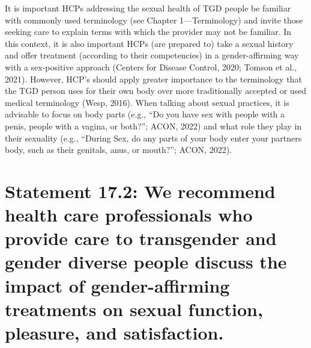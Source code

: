 \documentclass[
]{book}
\begin{document}
It is important HCPs addressing the sexual
health of TGD people be familiar with commonly
used terminology (see Chapter 1---Terminology)
and invite those seeking care to explain terms
with which the provider may not be familiar. In
this context, it is also important HCPs (are
prepared to) take a sexual history and offer treatment (according to their competencies) in a
gender-affirming way with a sex-positive approach
(Centers for Disease Control, 2020; Tomson et al.,
2021). However, HCP's should apply greater
importance to the terminology that the TGD
person uses for their own body over more traditionally accepted or used medical terminology
(Wesp, 2016). When talking about sexual practices, it is advisable to focus on body parts (e.g.,
``Do you have sex with people with a penis, people with a vagina, or both?''; ACON, 2022) and
what role they play in their sexuality (e.g.,
``During Sex, do any parts of your body enter
your partners body, such as their genitals, anus,
or mouth?''; ACON, 2022).

\hypertarget{statement-17.2-we-recommend-health-care-professionals-who-provide-care-to-transgender-and-gender-diverse-people-discuss-the-impact-of-gender-affirming-treatments-on-sexual-function-pleasure-and-satisfaction.}{%
\section*{Statement 17.2: We recommend health care professionals who provide care to transgender and gender diverse people discuss the impact of gender-affirming treatments on sexual function, pleasure, and satisfaction.}\label{statement-17.2-we-recommend-health-care-professionals-who-provide-care-to-transgender-and-gender-diverse-people-discuss-the-impact-of-gender-affirming-treatments-on-sexual-function-pleasure-and-satisfaction.}}
\end{document}
